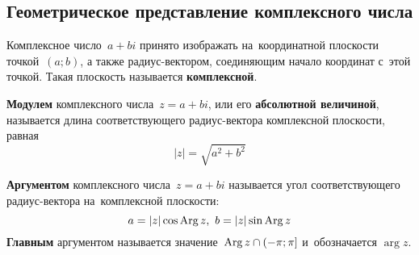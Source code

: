 \subsection{Геометрическое представление комплексного числа}
Комплексное число~$a + bi$ принято изображать на~координатной плоскости точкой~$(a; b)$, а также радиус-вектором, соединяющим начало координат с~этой точкой.
Такая плоскость называется \textbf{комплексной}.

\textbf{Модулем} комплексного числа~$z = a + bi$, или его \textbf{абсолютной величиной}, называется длина соответствующего радиус-вектора комплексной плоскости, равная
\begin{equation*}
|z| = \sqrt{a^2 + b^2}
\end{equation*}

\textbf{Аргументом} комплексного числа~$z = a + bi$ называется угол соответствующего радиус-вектора на~комплексной плоскости:
\begin{equation*}
a = |z| \cos \operatorname{Arg} z, \ b = |z| \sin \operatorname{Arg} z
\end{equation*}
\textbf{Главным} аргументом называется значение~$\operatorname{Arg} z \cap (-\pi; \pi]$ и~обозначается $\arg z$.